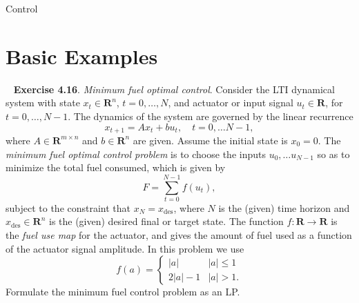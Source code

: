 \begin{chapter}{Control}

    \section{Basic Examples}

    ~\cite{boyd_convex_optimization} \textbf{Exercise 4.16}. \textit{Minimum fuel optimal control}.
    Consider the LTI dynamical system with state $x_t \in \mathbf{R}^n$, $t = 0, \ldots, N$, and actuator
    or input signal $u_t \in \mathbf{R}$, for $t = 0, \ldots, N-1$. The dynamics of the system are governed by the
    linear recurrence
    \[x_{t+1} = Ax_t + bu_t, \quad t=0, \ldots N-1,\]
    where $A \in \mathbf{R}^{m \times n}$ and $b \in \mathbf{R}^n$ are given. Assume the initial state is $x_0 = 0$.
    The \textit{minimum fuel optimal control problem} is to choose the inputs $u_0, \ldots u_{N-1}$ so as to
    minimize the total fuel consumed, which is given by
    \[F = \sum_{t=0}^{N-1}f(u_t),\]
    subject to the constraint that $x_N = x_{\text{des}}$, where $N$ is the (given) time horizon and
    $x_{\text{des}} \in \mathbf{R}^n$ is the (given) desired final or target state. The function $f: \mathbf{R} \to \mathbf{R}$
    is the \textit{fuel use map} for the actuator, and gives the amount of fuel used as a function of the actuator signal amplitude.
    In this problem we use
    \[f(a) = \begin{cases}
        \left| a \right| & \left| a \right| \le 1 \\
        2 \left| a \right| - 1 & \left| a \right| > 1.
        \end{cases}\]
    Formulate the minimum fuel control problem as an LP. 


\end{chapter}
